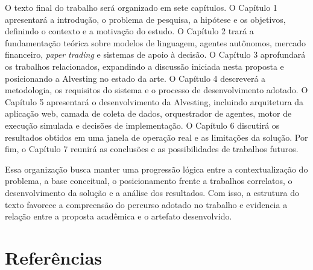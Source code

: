 \documentclass[portuguese]{sbcreviews-2025}
\begin{document}
O texto final do trabalho será organizado em sete capítulos. O Capítulo 1 apresentará a introdução, o problema de pesquisa, a hipótese e os objetivos, definindo o contexto e a motivação do estudo. O Capítulo 2 trará a fundamentação teórica sobre modelos de linguagem, agentes autônomos, mercado financeiro, \textit{paper trading} e sistemas de apoio à decisão. O Capítulo 3 aprofundará os trabalhos relacionados, expandindo a discussão iniciada nesta proposta e posicionando a Alvesting no estado da arte. O Capítulo 4 descreverá a metodologia, os requisitos do sistema e o processo de desenvolvimento adotado. O Capítulo 5 apresentará o desenvolvimento da Alvesting, incluindo arquitetura da aplicação web, camada de coleta de dados, orquestrador de agentes, motor de execução simulada e decisões de implementação. O Capítulo 6 discutirá os resultados obtidos em uma janela de operação real e as limitações da solução. Por fim, o Capítulo 7 reunirá as conclusões e as possibilidades de trabalhos futuros.

Essa organização busca manter uma progressão lógica entre a contextualização do problema, a base conceitual, o posicionamento frente a trabalhos correlatos, o desenvolvimento da solução e a análise dos resultados. Com isso, a estrutura do texto favorece a compreensão do percurso adotado no trabalho e evidencia a relação entre a proposta acadêmica e o artefato desenvolvido.

\section*{Referências}
\end{document}
